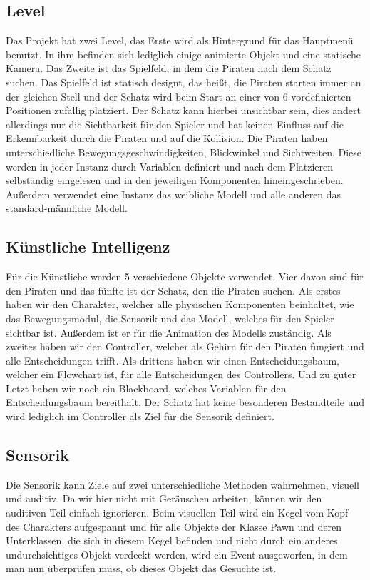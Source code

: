 \documentclass[
	12pt, %
	a4paper,
	listof=totoc, %
	bibliography=totoc, %
	numbers=noenddot, %
	ngerman, %
	headsepline, %
	oneside %
	]{scrbook} %
\begin{document}
\subsection{Level}
Das Projekt hat zwei Level, das Erste wird als Hintergrund für das Hauptmenü benutzt. In ihm befinden sich lediglich einige animierte Objekt und eine statische Kamera. Das Zweite ist das Spielfeld, in dem die Piraten nach dem Schatz suchen. Das Spielfeld ist statisch designt, das heißt, die Piraten starten immer an der gleichen Stell und der Schatz wird beim Start an einer von 6 vordefinierten Positionen zufällig platziert. Der Schatz kann hierbei unsichtbar sein, dies ändert allerdings nur die Sichtbarkeit für den Spieler und hat keinen Einfluss auf die Erkennbarkeit durch die Piraten und auf die Kollision. Die Piraten haben unterschiedliche Bewegungsgeschwindigkeiten, Blickwinkel und Sichtweiten. Diese werden in jeder Instanz durch Variablen definiert und nach dem Platzieren selbständig eingelesen und in den jeweiligen Komponenten hineingeschrieben. Außerdem verwendet eine Instanz das weibliche Modell und alle anderen das standard-männliche Modell.

\subsection{Künstliche Intelligenz}
Für die Künstliche werden 5 verschiedene Objekte verwendet. Vier davon sind für den Piraten und das fünfte ist der Schatz, den die Piraten suchen. Als erstes haben wir den Charakter, welcher alle physischen Komponenten beinhaltet, wie das Bewegungsmodul, die Sensorik und das Modell, welches für den Spieler sichtbar ist. Außerdem ist er für die Animation des Modells zuständig. Als zweites haben wir den Controller, welcher als Gehirn für den Piraten fungiert und alle Entscheidungen trifft. Als drittens haben wir einen Entscheidungsbaum, welcher ein Flowchart ist, für alle Entscheidungen des Controllers.  Und zu guter Letzt haben wir noch ein 
Blackboard, welches Variablen für den Entscheidungsbaum bereithält. Der Schatz hat keine besonderen Bestandteile und wird lediglich im Controller als Ziel für die Sensorik definiert.

\subsection{Sensorik}
Die Sensorik kann Ziele auf zwei unterschiedliche Methoden wahrnehmen, visuell und auditiv. Da wir hier nicht mit Geräuschen arbeiten, können wir den auditiven Teil einfach ignorieren. Beim visuellen Teil wird ein Kegel vom Kopf des Charakters aufgespannt und für alle Objekte der Klasse Pawn und deren Unterklassen, die sich in diesem Kegel befinden und nicht durch ein anderes undurchsichtiges Objekt verdeckt werden, wird ein Event ausgeworfen, in dem man nun überprüfen muss, ob dieses Objekt das Gesuchte ist.
\end{document}
